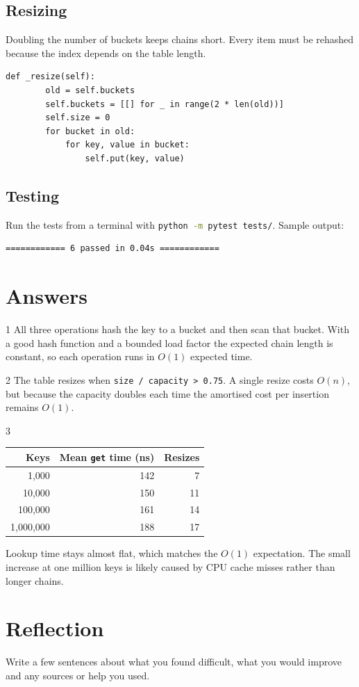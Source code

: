 \documentclass[11pt]{article}
\begin{document}
\subsection{Resizing}
Doubling the number of buckets keeps chains short. Every item must be rehashed because the index depends on the table length.
\begin{lstlisting}[firstnumber=20]
    def _resize(self):
        old = self.buckets
        self.buckets = [[] for _ in range(2 * len(old))]
        self.size = 0
        for bucket in old:
            for key, value in bucket:
                self.put(key, value)
\end{lstlisting}

\subsection{Testing}
Run the tests from a terminal with \lstinline[language=bash]!python -m pytest tests/!. Sample output:
\begin{lstlisting}[language={},numbers=none,backgroundcolor=\color{black!85},basicstyle=\ttfamily\small\color{white},rulecolor=\color{black}]
============ 6 passed in 0.04s ============
\end{lstlisting}

\section{Answers}

\begin{answerbox}{1}
All three operations hash the key to a bucket and then scan that bucket. With a good hash function and a bounded load factor the expected chain length is constant, so each operation runs in $O(1)$ expected time.
\end{answerbox}

\begin{answerbox}{2}
The table resizes when \texttt{size / capacity > 0.75}. A single resize costs $O(n)$, but because the capacity doubles each time the amortised cost per insertion remains $O(1)$.
\end{answerbox}

\begin{answerbox}{3}
\begin{center}
\begin{tabular}{rrr}
  \toprule
  Keys & Mean \texttt{get} time (ns) & Resizes \\
  \midrule
  1,000 & 142 & 7 \\
  10,000 & 150 & 11 \\
  100,000 & 161 & 14 \\
  1,000,000 & 188 & 17 \\
  \bottomrule
\end{tabular}
\end{center}
Lookup time stays almost flat, which matches the $O(1)$ expectation. The small increase at one million keys is likely caused by CPU cache misses rather than longer chains.
\end{answerbox}

\section{Reflection}
Write a few sentences about what you found difficult, what you would improve and any sources or help you used.
\end{document}
